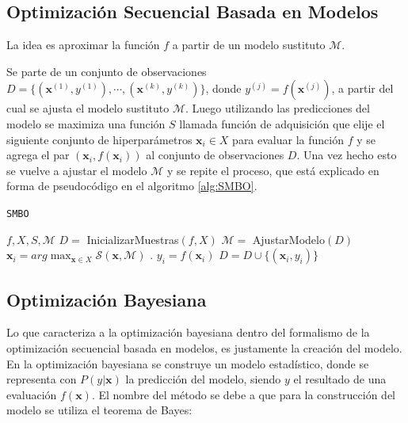\subsection{Optimización Secuencial Basada en Modelos}

La idea es aproximar la función $f$ a partir de un modelo sustituto $\mathcal{M}$.

Se parte de un conjunto de observaciones $D = \{(\textbf{x}^{(1)},y^{(1)}), \cdots, (\textbf{x}^{(k)},y^{(k)}) \}$, donde $y^{(j)} = f(\textbf{x}^{(j)})$, a partir del cual se ajusta el modelo sustituto $\mathcal{M}$. Luego utilizando las predicciones del modelo se maximiza una función $S$ llamada función de adquisición que elije el siguiente conjunto de hiperparámetros $\textbf{x}_i \in X$ para evaluar la función $f$ y se agrega el par $(\textbf{x}_i, f(\textbf{x}_i))$ al conjunto de observaciones $D$. Una vez hecho esto se vuelve a ajustar el modelo $\mathcal{M}$ y se repite el proceso, que está explicado en forma de pseudocódigo en el algoritmo \ref{alg:SMBO}.



\begin{algorithm}
\caption{\texttt{SMBO}}
\label{alg:SMBO}
\begin{algorithmic}[1]
\Require $f, X, S,\mathcal{M}$
\State $D =$ InicializarMuestras$(f, X)$
\vspace{1mm}
	\State $\mathcal{M} =$ AjustarModelo$(D)$
	\State $\textbf{x}_{i} = arg \max_{\textbf{x}\in X} \mathcal{S}(\textbf{x}, \mathcal{M})$ .
	\State $y_i = f(\textbf{x}_i)$	
	\State $D = D \cup \{(\textbf{x}_i, y_i)\}$
\EndFor
\vspace{3mm}

\end{algorithmic}
\end{algorithm}

\subsection*{Optimización Bayesiana}

Lo que caracteriza a la optimización bayesiana dentro del formalismo de la optimización secuencial basada en modelos, es justamente la creación del modelo.
En la optimización bayesiana se construye un modelo estadístico, donde se representa con  $P(y|\textbf{x})$ la predicción del modelo, siendo $y$ el resultado de una evaluación $f(\textbf{x})$. El nombre del método se debe a que para la construcción del modelo se utiliza el teorema de Bayes:
  
